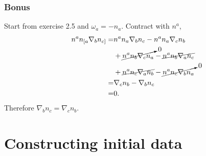 \documentclass{article}
\begin{document}
\subsubsection*{Bonus}
Start from exercise 2.5 and $\omega_a = -n_a$. Contract with $n^a$,
\begin{align}
	n^an_{[a}\nabla_bn_{c]} =& n^an_a\nabla_bn_c - n^an_a\nabla_c n_b\\
	& + \cancelto{0}{n^an_b\nabla_c n_a} - \cancel{n^an_b\nabla_a n_c}\\
	& + \cancel{n^an_c\nabla_a n_b} - \cancelto{0}{n^an_c\nabla_b n_a}\\
	=& \nabla_cn_b - \nabla_bn_c\\
	=&0.
\end{align}
Therefore $\nabla_bn_c = \nabla_cn_b$.



\section{Constructing initial data}
\end{document}
